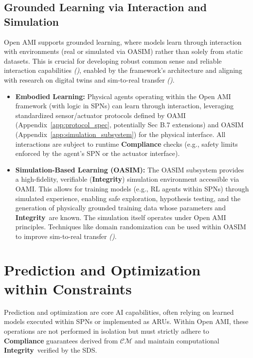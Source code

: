\documentclass[12pt,a4paper]{report}
\renewcommand{\citep}[1]{\textit{\scriptsize{(\cite{#1})}}}
\newcommand{\Integrity}{\textbf{Integrity}}
\begin{document}
	\subsection{Grounded Learning via Interaction and Simulation}
	\label{sec:2-5-4-new}
	
	Open AMI supports grounded learning, where models learn through interaction with environments (real or simulated via OASIM) rather than solely from static datasets. This is crucial for developing robust common sense and reliable interaction capabilities \citep{Physics-InspiredReasoning_Ref33}, enabled by the framework's architecture and aligning with research on digital twins and sim-to-real transfer \citep{Berg2025DigitalTwin, Li2025DigitalTwins, Josifovski_SCDA_2025}.
	\begin{itemize}
		\item \textbf{Embodied Learning:} Physical agents operating within the Open AMI framework (with logic in SPNs) can learn through interaction, leveraging standardized sensor/actuator protocols defined by OAMI (Appendix~\ref{app:protocol_spec}, potentially Sec B.7 extensions) and OASIM (Appendix~\ref{app:simulation_subsystem}) for the physical interface. All interactions are subject to runtime \textbf{Compliance} checks (e.g., safety limits enforced by the agent's SPN or the actuator interface).
		\item \textbf{Simulation-Based Learning (OASIM):} The OASIM subsystem provides a high-fidelity, verifiable (\Integrity) simulation environment accessible via OAMI. This allows for training models (e.g., RL agents within SPNs) through simulated experience, enabling safe exploration, hypothesis testing, and the generation of physically grounded training data whose parameters and \Integrity\ are known. The simulation itself operates under Open AMI principles. Techniques like domain randomization can be used within OASIM to improve sim-to-real transfer \citep{Tobin_Domain_Randomization_2017}.
	\end{itemize}
	
	\section{Prediction and Optimization within Constraints}
	\label{sec:2-6}
	
	Prediction and optimization are core AI capabilities, often relying on learned models executed within SPNs or implemented as ARUs. Within Open AMI, these operations are not performed in isolation but must strictly adhere to \textbf{Compliance} guarantees derived from $\mathcal{CM}$ and maintain computational \Integrity\ verified by the SDS.
	
\end{document}
